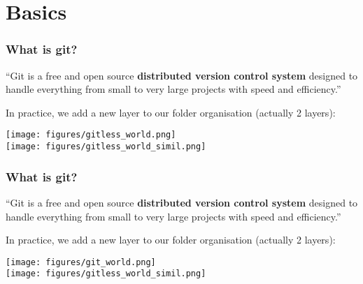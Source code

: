 \documentclass[xcolor=dvipsnames,10pt]{beamer}
\begin{document}
\section{Basics}
\begin{frame}
 \frametitle{What is git?}
 
 \begin{minipage}{1.0\textwidth}
  ``Git is a free and open source \textbf{distributed version control system} designed to handle everything from small to very large projects with speed and efficiency.''
 \end{minipage}
 \vspace*{0.4cm}
 
 \pause
 
 In practice, we add a new layer to our folder organisation (actually 2 layers):
 
 \begin{center}
 \texttt{[image: figures/gitless\_world.png]}\\
 \texttt{[image: figures/gitless\_world\_simil.png]}  
 \end{center}
 
\end{frame}
\addtocounter{framenumber}{-1}
\begin{frame}
 \frametitle{What is git?}
 
 \begin{minipage}{1.0\textwidth}
  ``Git is a free and open source \textbf{distributed version control system} designed to handle everything from small to very large projects with speed and efficiency.''
 \end{minipage}
 \vspace*{0.4cm}
 
 In practice, we add a new layer to our folder organisation (actually 2 layers):
 
 \begin{center}
 \texttt{[image: figures/git\_world.png]}\\
 \texttt{[image: figures/gitless\_world\_simil.png]}  
 \end{center}
 
\end{frame}
\addtocounter{framenumber}{-1}
\end{document}
